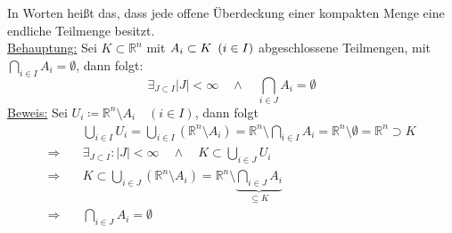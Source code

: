 \begin{itemize}
	In Worten heißt das, dass jede offene Überdeckung einer kompakten Menge eine endliche Teilmenge besitzt.\\
	\underline{Behauptung:}
		Sei $K \subset \mathbb{R}^n$ mit $A_i \subset K \hspace{0.5em} (i \in I)$ abgeschlossene Teilmengen, mit $\bigcap_{i \in I} A_i = \emptyset$, dann folgt:
		\[ \exists_{J \subset I} |J| < \infty \quad \wedge \quad \bigcap_{i \in J} A_i = \emptyset \]
	\underline{Beweis:}
		Sei $U_i \coloneqq \mathbb{R}^n \setminus A_i \quad (i \in I)$, dann folgt
		\begin{align*}
			&\bigcup_{i \in I} U_i = \bigcup_{i \in I} (\mathbb{R}^n \setminus A_i) = \mathbb{R}^n \setminus \bigcap_{i \in I} A_i = \mathbb{R}^n \setminus \emptyset = \mathbb{R}^n \supset K\\
			\Rightarrow\quad &\exists_{J \subset I}\colon |J| < \infty \quad\wedge\quad K \subset \bigcup_{i \in J} U_i \\
			\Rightarrow\quad &K \subset \bigcup_{i \in J} (\mathbb{R}^n \setminus A_i) = \mathbb{R}^n \setminus \underbrace{\bigcap_{i \in J} A_i}_{\subseteq K}\\
	\Rightarrow\quad &\bigcap_{i\in J}A_i=\emptyset
		\end{align*}
 \end{itemize}
